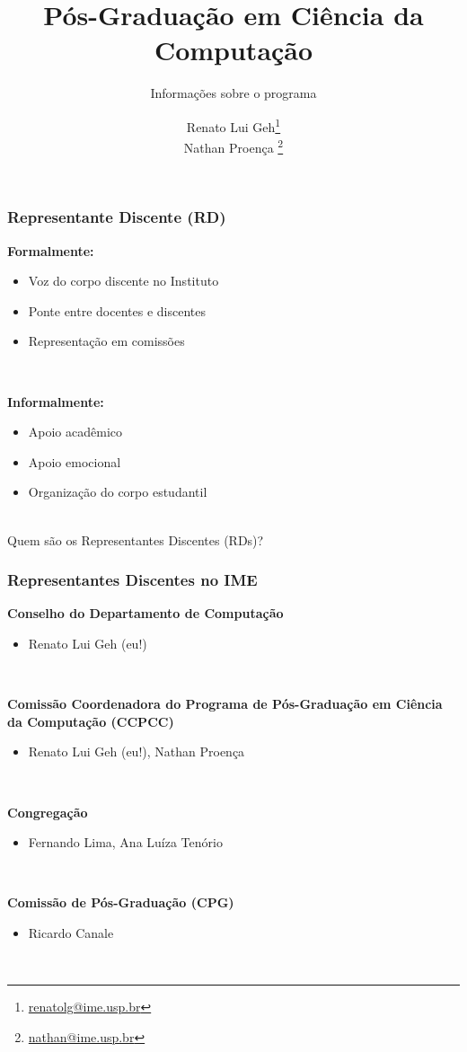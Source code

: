 \documentclass{beamer}
\title{\LARGE Pós-Graduação em Ciência da Computação}
\subtitle{\Large Informações sobre o programa}
\author{Renato Lui Geh\footnote{\url{renatolg@ime.usp.br}}\\Nathan Proença
  \footnote{\url{nathan@ime.usp.br}}}
\date{}
\begin{document}
\maketitle

\begin{frame}
  \frametitle{Representante Discente (RD)}

  \textbf{Formalmente:}
  \begin{itemize}
    \item Voz do corpo discente no Instituto
    \item Ponte entre docentes e discentes
    \item Representação em comissões
  \end{itemize}~\\\pause

  \textbf{Informalmente:}
  \begin{itemize}
    \item Apoio acadêmico
    \item Apoio emocional
    \item Organização do corpo estudantil
  \end{itemize}~\\

  Quem são os Representantes Discentes (RDs)?
\end{frame}

\begin{frame}
  \frametitle{Representantes Discentes no IME}

  \textbf{Conselho do Departamento de Computação}
  \begin{itemize}
    \item Renato Lui Geh (eu!)
  \end{itemize}~\\\pause

  \textbf{Comissão Coordenadora do Programa de Pós-Graduação em Ciência da Computação (CCPCC)}
  \begin{itemize}
    \item Renato Lui Geh (eu!), Nathan Proença
  \end{itemize}~\\\pause

  \textbf{Congregação}
  \begin{itemize}
    \item Fernando Lima, Ana Luíza Tenório
  \end{itemize}~\\\pause

  \textbf{Comissão de Pós-Graduação (CPG)}
  \begin{itemize}
    \item Ricardo Canale
  \end{itemize}~\\ 
\end{frame}
\end{document}
